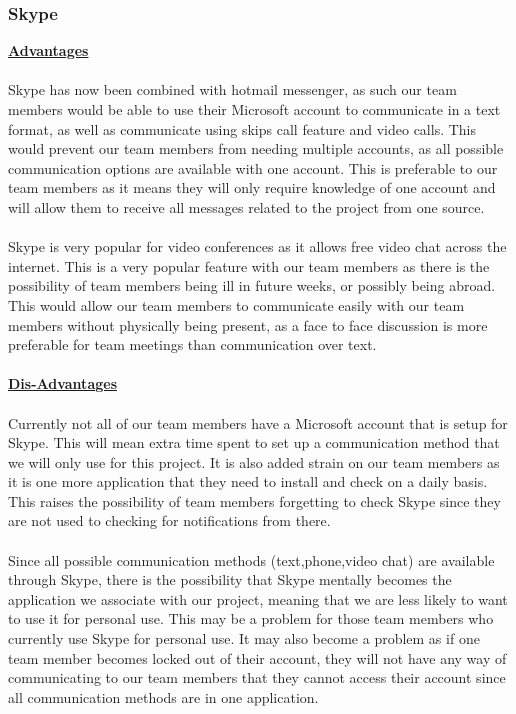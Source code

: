 \subsubsection{Skype}
\textbf {\underline{Advantages}}\\
\\
Skype has now been combined with hotmail messenger, as such our team members would be able to use their Microsoft account to communicate in a text format, as well as communicate using skips call feature and video calls. This would prevent our team members from needing multiple accounts, as all possible communication options are available with one account. This is preferable to our team members as it means they will only require knowledge of one account and will allow them to receive all messages related to the project from one source.\\
\\
Skype is very popular for video conferences as it allows free video chat across the internet. This is a very popular feature with our team members as there is the possibility of team members being ill in future weeks, or possibly being abroad. This would allow our team members to communicate easily with our team members without physically being present, as a face to face discussion is more preferable for team meetings than communication over text. \\
\\
\textbf {\underline{Dis-Advantages}}\\
\\
Currently not all of our team members have a Microsoft account that is setup for Skype. This will mean extra time spent to set up a communication method that we will only use for this project. It is also added strain on our team members as it is one more application that they need to install and check on a daily basis. This raises the possibility of team members forgetting to check Skype since they are not used to checking for notifications from there.\\
\\
Since all possible communication methods (text,phone,video chat) are available through Skype, there is the possibility that Skype mentally becomes the application we associate with our project, meaning that we are less likely to want to use it for personal use. This may be a problem for those team members who currently use Skype for personal use. It may also become a problem as if one team member becomes locked out of their account, they will not have any way of communicating to our team members that they cannot access their account since all communication methods are in one application. \\
